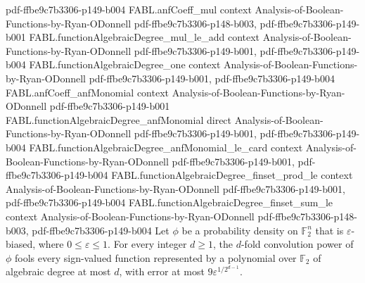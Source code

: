 \begin{theorem}
{    pdf-ffbe9c7b3306-p149-b004}
\proofstep
  {FABL.anfCoeff_mul}
  {context}
  {Analysis-of-Boolean-Functions-by-Ryan-ODonnell}
  {pdf-ffbe9c7b3306-p148-b003,
    pdf-ffbe9c7b3306-p149-b001}
\proofstep
  {FABL.functionAlgebraicDegree_mul_le_add}
  {context}
  {Analysis-of-Boolean-Functions-by-Ryan-ODonnell}
  {pdf-ffbe9c7b3306-p149-b001,
    pdf-ffbe9c7b3306-p149-b004}
\proofstep
  {FABL.functionAlgebraicDegree_one}
  {context}
  {Analysis-of-Boolean-Functions-by-Ryan-ODonnell}
  {pdf-ffbe9c7b3306-p149-b001,
    pdf-ffbe9c7b3306-p149-b004}
\proofstep
  {FABL.anfCoeff_anfMonomial}
  {context}
  {Analysis-of-Boolean-Functions-by-Ryan-ODonnell}
  {pdf-ffbe9c7b3306-p149-b001}
\proofstep
  {FABL.functionAlgebraicDegree_anfMonomial}
  {direct}
  {Analysis-of-Boolean-Functions-by-Ryan-ODonnell}
  {pdf-ffbe9c7b3306-p149-b001,
    pdf-ffbe9c7b3306-p149-b004}
\proofstep
  {FABL.functionAlgebraicDegree_anfMonomial_le_card}
  {context}
  {Analysis-of-Boolean-Functions-by-Ryan-ODonnell}
  {pdf-ffbe9c7b3306-p149-b001,
    pdf-ffbe9c7b3306-p149-b004}
\proofstep
  {FABL.functionAlgebraicDegree_finset_prod_le}
  {context}
  {Analysis-of-Boolean-Functions-by-Ryan-ODonnell}
  {pdf-ffbe9c7b3306-p149-b001,
    pdf-ffbe9c7b3306-p149-b004}
\proofstep
  {FABL.functionAlgebraicDegree_finset_sum_le}
  {context}
  {Analysis-of-Boolean-Functions-by-Ryan-ODonnell}
  {pdf-ffbe9c7b3306-p148-b003,
    pdf-ffbe9c7b3306-p149-b004}
Let $\phi$ be a probability density on $\mathbb{F}_2^n$ that is $\varepsilon$-biased,
where $0\leq\varepsilon\leq1$. For every integer $d\geq1$, the $d$-fold convolution
power of $\phi$ fools every sign-valued function represented by a polynomial over
$\mathbb{F}_2$ of algebraic degree at most $d$, with error at most
$9\varepsilon^{1/2^{d-1}}$.
\end{theorem}
